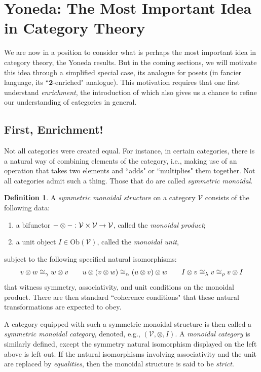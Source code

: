 \documentclass[11pt]{book}
\theoremstyle{definition}
\theoremstyle{definition}
\newtheorem{definition}{Definition}[section]
\theoremstyle{definition}
\theoremstyle{theorem}
\theoremstyle{definition}
\begin{document}
\section{Yoneda: The Most Important Idea in Category Theory}
We are now in a position to consider what is perhaps the most important idea in category theory, the Yoneda results. But in the coming sections, we will motivate this idea through a simplified special case, its analogue for posets (in fancier language, its ``$\textbf{2}$-enriched" analogue). This motivation requires that one first understand \textit{enrichment}, the introduction of which also gives us a chance to refine our understanding of categories in general.  
\subsection{First, Enrichment!}
Not all categories were created equal. For instance, in certain categories, there is a natural way of combining elements of the category, i.e., making use of an operation that takes two elements and ``adds" or ``multiplies" them together. Not all categories admit such a thing. Those that do are called \textit{symmetric monoidal}. 
\begin{definition} 
	A \textit{symmetric monoidal structure} on a category $\mathcal{V}$ consists of the following data: 
	\begin{enumerate}
		\item a bifunctor $\-- \otimes \--: \mathcal{V} \times \mathcal{V} \rightarrow \mathcal{V}$, called the \textit{monoidal product}; 
		\item a unit object $I \in \text{Ob}(\mathcal{V})$, called the \textit{monoidal unit}, 
	\end{enumerate} 
	subject to the following specified natural isomorphisms: 
	\begin{equation}
	v \otimes w \cong_{\gamma} w \otimes v \hspace*{2em} u \otimes (v \otimes w) \cong_{\alpha} (u \otimes v) \otimes w \hspace*{2em} I \otimes v \cong_{\lambda} v \cong_{\rho} v \otimes I
	\end{equation}
	that witness symmetry, associativity, and unit conditions on the monoidal product. There are then standard ``coherence conditions" that these natural transformations are expected to obey. \par 
	A category equipped with such a symmetric monoidal structure is then called a \textit{symmetric monoidal category}, denoted, e.g., $(\mathcal{V}, \otimes, I)$. A \textit{monoidal category} is similarly defined, except the symmetry natural isomorphism displayed on the left above is left out. If the natural isomorphisms involving associativity and the unit are replaced by \textit{equalities}, then the monoidal structure is said to be \textit{strict}.
	\end{definition}  
\end{document}
